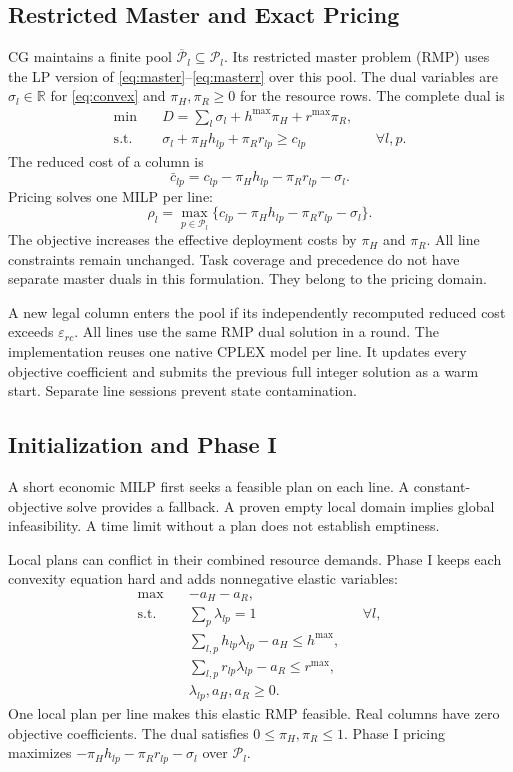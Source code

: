 \subsection{Restricted Master and Exact Pricing}
CG maintains a finite pool $\overline{\mathcal P}_l\subseteq\mathcal P_l$. Its restricted master problem (RMP) uses the LP version of \eqref{eq:master}--\eqref{eq:masterr} over this pool. The dual variables are $\sigma_l\in\mathbb R$ for \eqref{eq:convex} and $\pi_H,\pi_R\geq0$ for the resource rows. The complete dual is
\begin{align}
\min\quad&D=\sum_l\sigma_l+h^{\max}\pi_H+r^{\max}\pi_R,\label{eq:dual}\\
\text{s.t.}\quad&\sigma_l+\pi_Hh_{lp}+\pi_Rr_{lp}\geq c_{lp}&&\forall l,p.
\end{align}
The reduced cost of a column is
\begin{equation}
\bar c_{lp}=c_{lp}-\pi_Hh_{lp}-\pi_Rr_{lp}-\sigma_l.\label{eq:rc}
\end{equation}
Pricing solves one MILP per line:
\begin{equation}
\rho_l=\max_{p\in\mathcal P_l}\{c_{lp}-\pi_Hh_{lp}-\pi_Rr_{lp}-\sigma_l\}.\label{eq:pp}
\end{equation}
The objective increases the effective deployment costs by $\pi_H$ and $\pi_R$. All line constraints remain unchanged. Task coverage and precedence do not have separate master duals in this formulation. They belong to the pricing domain.

A new legal column enters the pool if its independently recomputed reduced cost exceeds $\varepsilon_{rc}$. All lines use the same RMP dual solution in a round. The implementation reuses one native CPLEX model per line. It updates every objective coefficient and submits the previous full integer solution as a warm start. Separate line sessions prevent state contamination.

\subsection{Initialization and Phase I}
A short economic MILP first seeks a feasible plan on each line. A constant-objective solve provides a fallback. A proven empty local domain implies global infeasibility. A time limit without a plan does not establish emptiness.

Local plans can conflict in their combined resource demands. Phase I keeps each convexity equation hard and adds nonnegative elastic variables:
\begin{align}
\max\quad&-a_H-a_R,\label{eq:p1}\\
\text{s.t.}\quad&\sum_p\lambda_{lp}=1&&\forall l,\nonumber\\
&\sum_{l,p}h_{lp}\lambda_{lp}-a_H\leq h^{\max},\nonumber\\
&\sum_{l,p}r_{lp}\lambda_{lp}-a_R\leq r^{\max},\nonumber\\
&\lambda_{lp},a_H,a_R\geq0.\nonumber
\end{align}
One local plan per line makes this elastic RMP feasible. Real columns have zero objective coefficients. The dual satisfies $0\leq\pi_H,\pi_R\leq1$. Phase I pricing maximizes $-\pi_Hh_{lp}-\pi_Rr_{lp}-\sigma_l$ over $\mathcal P_l$.

